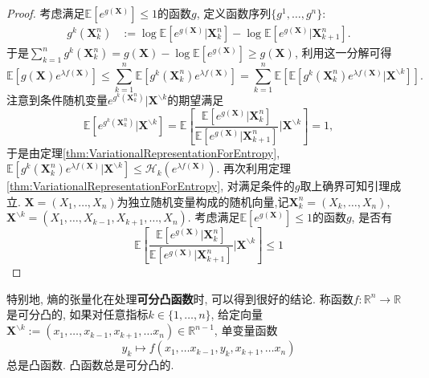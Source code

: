 \begin{proof}
	考虑满足$\mathbb{E}[e^{g(\bm{X})}] \leq 1$的函数$g$, 定义函数序列$\{g^1, \dots, g^n\}$: 
	\begin{align*}
		g^k(\bm{X}_k^n) &:= \log \mathbb{E}[e^{g(\bm{X})} | \bm{X}_k^n] - \log \mathbb{E}[e^{g(\bm{X})} | \bm{X}_{k+1}^n]. 
	\end{align*}
	于是$\sum_{k=1}^n g^k(\bm{X}_k^n) = g(\bm{X}) - \log \mathbb{E}[ e^{g(\bm{X})} ] \geq g(\bm{X})$, 利用这一分解可得
	\begin{equation*}
		\mathbb{E}[ g(\bm{X}) e^{\lambda f(\bm{X})}]
		\leq \sum_{k=1}^n \mathbb{E}[ g^k(\bm{X}_k^n) e^{\lambda f(\bm{X})} ] 
		= \sum_{k=1}^n \mathbb{E}\left[ \mathbb{E}[ g^k(\bm{X}_k^n) e^{\lambda f(\bm{X})} | \bm{X}^{\backslash k} ] \right]. 
	\end{equation*}
	注意到条件随机变量$e^{g^k(\bm{X}_k^n)}| \bm{X}^{\backslash k}$的期望满足
	\begin{equation*}
		\mathbb{E}[e^{g^k(\bm{X}_k^n)}| \bm{X}^{\backslash k}]
		= \mathbb{E} \left[ \frac{\mathbb{E}[e^{g(\bm{X})} | \bm{X}_k^n]}{\mathbb{E}[e^{g(\bm{X})} | \bm{X}_{k+1}^n]} \bigg| \bm{X}^{\backslash k} \right]
		=1,  
	\end{equation*}
	于是由定理\ref{thm:VariationalRepresentationForEntropy}, $\mathbb{E}[ g^k(\bm{X}_k^n) e^{\lambda f(\bm{X})} | \bm{X}^{\backslash k} ] \leq \mathcal{H}_k(e^{\lambda f(\bm{X})})$. 
	再次利用定理\ref{thm:VariationalRepresentationForEntropy}, 对满足条件的$g$取上确界可知引理成立. 
	\sp 
	$\bm{X} = (X_1, \dots, X_n)$为独立随机变量构成的随机向量,记$\bm{X}_k^n = (X_k, \dots, X_n)$, $\bm{X}^{\backslash k} = (X_1, \dots, X_{k-1}, X_{k+1}, \dots, X_n)$. 
	考虑满足$\mathbb{E}[e^{g(\bm{X})}] \leq 1$的函数$g$, 是否有
	\begin{equation*}
		\mathbb{E} \left[ \frac{\mathbb{E}[e^{g(\bm{X})} | \bm{X}_k^n]}{\mathbb{E}[e^{g(\bm{X})} | \bm{X}_{k+1}^n]} \bigg| \bm{X}^{\backslash k} \right] \leq 1
	\end{equation*}
	\sp 
\end{proof}

特别地, 熵的张量化在处理\textbf{可分凸函数}时, 可以得到很好的结论. 
称函数$f \colon \mathbb{R}^n \to \mathbb{R}$是可分凸的, 如果对任意指标$k \in \{1, \dots, n\}$, 给定向量$\bm{X}^{\backslash k} := (x_1, \dots, x_{k-1}, x_{k+1}, \dots x_n) \in \mathbb{R}^{n-1}$, 单变量函数
\begin{equation*}
	y_k \mapsto f(x_1, \dots x_{k-1}, y_k, x_{k+1}, \dots x_n)
\end{equation*}
总是凸函数. 
凸函数总是可分凸的. 

